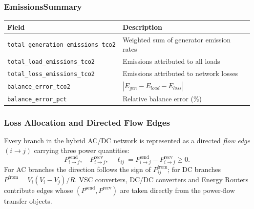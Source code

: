 \subsubsection{EmissionsSummary}
\begin{center}
\begin{tabular}{ll}
\hline\hline
\textbf{Field} & \textbf{Description} \\
\hline
\texttt{total\_generation\_emissions\_tco2} & Weighted sum of generator emission rates \\
\texttt{total\_load\_emissions\_tco2} & Emissions attributed to all loads \\
\texttt{total\_loss\_emissions\_tco2} & Emissions attributed to network losses \\
\texttt{balance\_error\_tco2} & $|E_{gen} - E_{load} - E_{loss}|$ \\
\texttt{balance\_error\_pct} & Relative balance error (\%) \\
\hline\hline
\end{tabular}
\end{center}

\subsubsection{Loss Allocation and Directed Flow Edges}
\label{sec:carbon-flow-edges}

Every branch in the hybrid AC/DC network is represented as a directed
\emph{flow edge} $(i \to j)$ carrying three power quantities:
\begin{equation}
  P_{i\to j}^{\text{send}},\quad
  P_{i\to j}^{\text{recv}},\quad
  \ell_{ij} = P_{i\to j}^{\text{send}} - P_{i\to j}^{\text{recv}} \geq 0.
\end{equation}
For AC branches the direction follows the sign of $P_{ij}^{\text{from}}$;
for DC branches $P^{\text{from}} = V_i(V_i - V_j)/R$.  VSC converters,
DC/DC converters and Energy Routers contribute edges whose
$(P^{\text{send}}, P^{\text{recv}})$ are taken directly from the
power-flow transfer objects.

